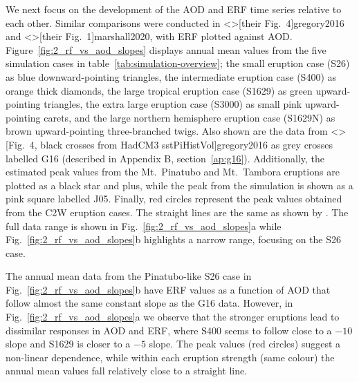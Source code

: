 \documentclass[draft]{agujournal2019}
\begin{document}
  We next focus on the development of the AOD and ERF time series relative to each
  other. Similar comparisons were conducted in \citeA<>[their Fig.\ 4]{gregory2016} and
  \citeA<>[their Fig.\ 1]{marshall2020}, with ERF plotted against AOD.
  Figure~\ref{fig:2_rf_vs_aod_slopes} displays annual mean values from the five
  simulation cases in table~\ref{tab:simulation-overview}; the small eruption case (S26)
  as blue downward-pointing triangles, the intermediate eruption case (S400) as orange
  thick diamonds, the large tropical eruption case (S1629) as green upward-pointing
  triangles, the extra large eruption case (S3000) as small pink upward-pointing carets,
  and the large northern hemisphere eruption case (S1629N) as brown upward-pointing
  three-branched twigs. Also shown are the data from \citeA<>[Fig.\ 4, black crosses
    from HadCM3 sstPiHistVol]{gregory2016} as grey crosses labelled G16 (described in
  Appendix B, section~\ref{ap:g16}). Additionally, the estimated peak values from the
  Mt.\ Pinatubo and Mt.\ Tambora eruptions are plotted as a black star and plus, while
  the peak from the  simulation is shown as a pink square labelled J05.
  Finally, red circles represent the peak values obtained from the C2W eruption cases.
  The straight lines are the same as shown by . The full data range
  is shown in Fig.~\ref{fig:2_rf_vs_aod_slopes}a while
  Fig.~\ref{fig:2_rf_vs_aod_slopes}b highlights a narrow range, focusing on the S26
  case.

  The annual mean data from the Pinatubo-like S26 case in
  Fig.~\ref{fig:2_rf_vs_aod_slopes}b have ERF values as a function of AOD that follow
  almost the same constant slope as the G16 data. However, in
  Fig.~\ref{fig:2_rf_vs_aod_slopes}a we observe that the stronger eruptions lead to
  dissimilar responses in AOD and ERF, where S400 seems to follow close to a \(-10\)
  slope and S1629 is closer to a \(-5\) slope. The peak values (red circles) suggest a
  non-linear dependence, while within each eruption strength (same colour) the annual
  mean values fall relatively close to a straight line.
\end{document}
